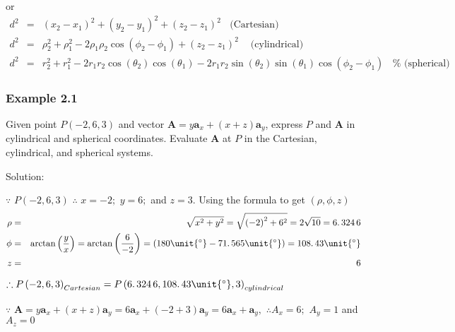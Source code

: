 \documentclass{article}
\begin{document}
or 
\begin{eqnarray*}
d^{2} &=&\left( x_{2}-x_{1}\right) ^{2}+\left( y_{2}-y_{1}\right)
^{2}+\left( z_{2}-z_{1}\right) ^{2}~~~~\text{(Cartesian)} \\
d^{2} &=&\rho _{2}^{2}+\rho _{1}^{2}-2\rho _{1}\rho _{2}\cos \left( \phi
_{2}-\phi _{1}\right) +\left( z_{2}-z_{1}\right) ^{2}~\text{~~~(cylindrical)}
\\
d^{2} &=&r_{2}^{2}+r_{1}^{2}-2r_{1}r_{2}\cos \left( \theta _{2}\right) \cos
\left( \theta _{1}\right) -2r_{1}r_{2}\sin \left( \theta _{2}\right) \sin
\left( \theta _{1}\right) \cos \left( \phi _{2}-\phi _{1}\right) ~~~~\text{%
(spherical)}
\end{eqnarray*}

\bigskip

\subsubsection{Example 2.1}

Given point $P\left( -2,6,3\right) $ and vector $\mathbf{A=}y\mathbf{a}%
_{x}+\left( x+z\right) \mathbf{a}_{y}$, express $P$ and $\mathbf{A}$ in
cylindrical and spherical coordinates. Evaluate $\mathbf{A}$ at $P$ in the
Cartesian, cylindrical, and spherical systems.

Solution:

$\because $ $P\left( -2,6,3\right) $ $\therefore $ $x=-2;$ $y=6;$ and $z=3$.
Using the formula to get $\left( \rho ,\phi ,z\right) $ 
\begin{eqnarray*}
\rho &=&\sqrt{x^{2}+y^{2}}=\sqrt{\left( -2\right) ^{2}+6^{2}}=2\sqrt{10}%
=6.\,\allowbreak 324\,6 \\
\phi &=&\arctan \left( \dfrac{y}{x}\right) =\arctan \left( \dfrac{6}{-2}%
\right) =\left( 180\unit{%
{{}^\circ}%
}-71.\,\allowbreak 565\unit{%
{{}^\circ}%
}\right) =108.\,\allowbreak 43\unit{%
{{}^\circ}%
} \\
z &=&6
\end{eqnarray*}

$\therefore P\left( -2,6,3\right) _{Cartesian}=P\left( 6.\,\allowbreak
324\,6,108.\,\allowbreak 43\unit{%
{{}^\circ}%
},3\right) _{cylindrical}$

$\because $ $\mathbf{A=}y\mathbf{a}_{x}+\left( x+z\right) \mathbf{a}_{y}=6%
\mathbf{a}_{x}+\left( -2+3\right) \mathbf{a}_{y}=\allowbreak 6\mathbf{a}_{x}+%
\mathbf{a}_{y},$ $\therefore A_{x}=6;$ $A_{y}=1$ and $A_{z}=0$
\end{document}
